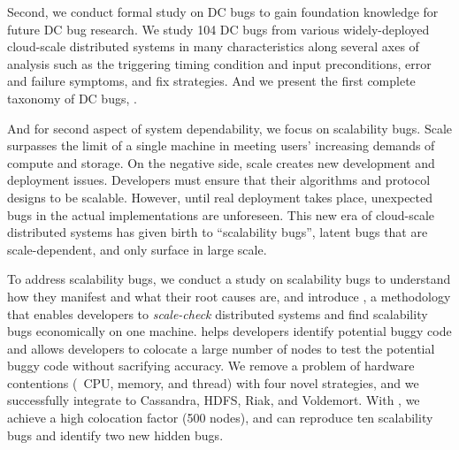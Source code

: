Second, we conduct formal study on DC bugs to gain foundation knowledge for
future DC bug research. We study 104 DC bugs from various widely-deployed
cloud-scale distributed systems in many characteristics along several axes of
analysis such as the triggering timing condition and input preconditions, error
and failure symptoms, and fix strategies. And we present the first complete
taxonomy of DC bugs, \taxdc.

And for second aspect of system dependability, we focus on scalability bugs.
Scale surpasses the limit of a single machine in meeting users' increasing
demands of compute and storage. On the negative side, scale creates new
development and deployment issues. Developers must ensure that their algorithms
and protocol designs to be scalable. However, until real deployment takes place,
unexpected bugs in the actual implementations are unforeseen. This new era of
cloud-scale distributed systems has given birth to ``scalability bugs'', latent
bugs that are scale-dependent, and only surface in large scale.

To address scalability bugs, we conduct a study on scalability bugs to
understand how they manifest and what their root causes are, and introduce \sck,
a methodology that enables developers to {\em scale-check} distributed systems
and find scalability bugs economically on one machine. \sck helps developers
identify potential buggy code and allows developers to colocate a large number
of nodes to test the potential buggy code without sacrifying accuracy. We remove
a problem of hardware contentions (\ie\ CPU, memory, and thread) with four novel
strategies, and we successfully integrate \sck to Cassandra, HDFS, Riak, and
Voldemort. With \sck, we achieve a high colocation factor (500 nodes), and can
reproduce ten scalability bugs and identify two new hidden bugs.
